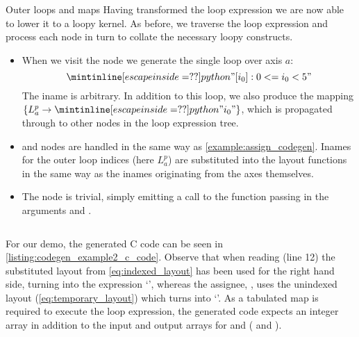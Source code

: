 \documentclass[thesis]{subfiles}
\begin{document}
\begin{example}{Outer loops and maps}
Having transformed the loop expression we are now able to lower it to a loopy kernel.
As before, we traverse the loop expression and process each node in turn to collate the necessary loopy constructs.

\begin{itemize}
  \item
    When we visit the  node we generate the single loop over axis $a$:
    \begin{equation*}
      \pycode{"{ [i_0]: 0 <= i_0 < 5 }"}
    \end{equation*}
    The iname  is arbitrary.
    In addition to this loop, we also produce the mapping $\{ L^p_a \to \pycode{"i_0"} \}$, which is propagated through to other nodes in the loop expression tree.
  \item
     and  nodes are handled in the same way as \cref{example:assign_codegen}.
    Inames for the outer loop indices (here $L^p_a$) are substituted into the layout functions in the same way as the inames originating from the axes themselves.
  \item
    The  node is trivial, simply emitting a call to the function passing in the arguments  and .
\end{itemize}

\begin{listing}
  \centering
  \begin{minipage}{.9\textwidth}
    \inputminted[linenos]{c}{./scripts/artefacts/codegen_example2_c_code_tidy.c}
  \end{minipage}
  \caption{
    C code generated for the loop expression.
  }
  \label{listing:codegen_example2_c_code}
\end{listing}

For our demo, the generated C code can be seen in \cref{listing:codegen_example2_c_code}.
Observe that when reading  (line 12) the substituted layout from \cref{eq:indexed_layout} has been used for the right hand side, turning into the expression `', whereas the assignee, , uses the unindexed layout (\cref{eq:temporary_layout}) which turns into `'.
As a tabulated map is required to execute the loop expression, the generated code expects an integer array  in addition to the input and output arrays for  and  ( and ).

\end{example}
\end{document}
